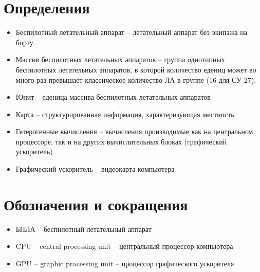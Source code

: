 \newpage
\section{Определения}

\begin{itemize}
\item Беспилотный летательный аппарат -- летательный
      аппарат без экипажа \lb на борту.

\item Массив беспилотных летательных аппаратов -- группа
      однотипных беспилотных летательных аппаратов, в которой
      количество едениц может во много раз превышает
      классическое количество ЛА в группе (16 для СУ-27).

\item Юнит -- еденица массива беспилотных летательных аппаратов

\item Карта -- структурированная информация, характеризующая местность

\item Гетерогенные вычисления -- вычисления производимые
      как на центральном процессоре, так и на других
      вычислительных блоках (графический ускоритель)

\item Графический ускоритель -- видеокарта компьютера

\end{itemize}

\newpage
\section{Обозначения и сокращения}

\begin{itemize}

\item БПЛА -- беспилотный летательный аппарат

\item CPU -- central processing unit -- центральный процессор компьютера

\item GPU -- graphic processing unit -- процессор графического ускорителя

\end{itemize}
